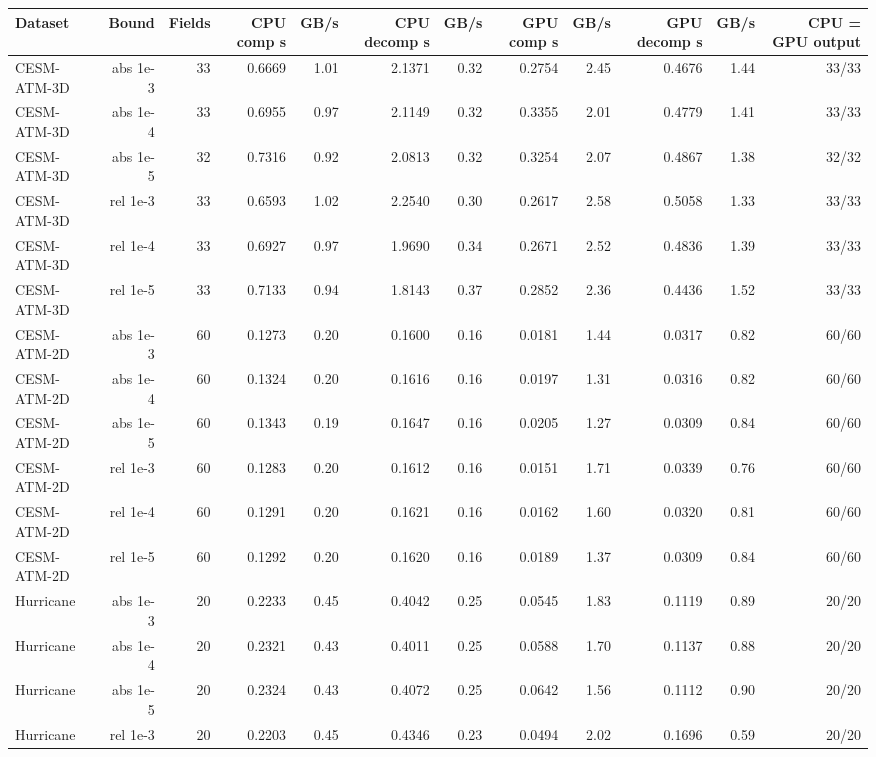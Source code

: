 \begin{tabular}{lrrrrrrrrrrr}
\toprule
\textbf{Dataset} & \textbf{Bound} & \textbf{Fields} & \textbf{CPU comp s} & \textbf{GB/s} & \textbf{CPU decomp s} & \textbf{GB/s} & \textbf{GPU comp s} & \textbf{GB/s} & \textbf{GPU decomp s} & \textbf{GB/s} & \textbf{CPU = GPU output} \\
\midrule
CESM-ATM-3D & abs 1e-3 & 33 & 0.6669 & 1.01 & 2.1371 & 0.32 & 0.2754 & 2.45 & 0.4676 & 1.44 & 33/33 \\
CESM-ATM-3D & abs 1e-4 & 33 & 0.6955 & 0.97 & 2.1149 & 0.32 & 0.3355 & 2.01 & 0.4779 & 1.41 & 33/33 \\
CESM-ATM-3D & abs 1e-5 & 32 & 0.7316 & 0.92 & 2.0813 & 0.32 & 0.3254 & 2.07 & 0.4867 & 1.38 & 32/32 \\
CESM-ATM-3D & rel 1e-3 & 33 & 0.6593 & 1.02 & 2.2540 & 0.30 & 0.2617 & 2.58 & 0.5058 & 1.33 & 33/33 \\
CESM-ATM-3D & rel 1e-4 & 33 & 0.6927 & 0.97 & 1.9690 & 0.34 & 0.2671 & 2.52 & 0.4836 & 1.39 & 33/33 \\
CESM-ATM-3D & rel 1e-5 & 33 & 0.7133 & 0.94 & 1.8143 & 0.37 & 0.2852 & 2.36 & 0.4436 & 1.52 & 33/33 \\
CESM-ATM-2D & abs 1e-3 & 60 & 0.1273 & 0.20 & 0.1600 & 0.16 & 0.0181 & 1.44 & 0.0317 & 0.82 & 60/60 \\
CESM-ATM-2D & abs 1e-4 & 60 & 0.1324 & 0.20 & 0.1616 & 0.16 & 0.0197 & 1.31 & 0.0316 & 0.82 & 60/60 \\
CESM-ATM-2D & abs 1e-5 & 60 & 0.1343 & 0.19 & 0.1647 & 0.16 & 0.0205 & 1.27 & 0.0309 & 0.84 & 60/60 \\
CESM-ATM-2D & rel 1e-3 & 60 & 0.1283 & 0.20 & 0.1612 & 0.16 & 0.0151 & 1.71 & 0.0339 & 0.76 & 60/60 \\
CESM-ATM-2D & rel 1e-4 & 60 & 0.1291 & 0.20 & 0.1621 & 0.16 & 0.0162 & 1.60 & 0.0320 & 0.81 & 60/60 \\
CESM-ATM-2D & rel 1e-5 & 60 & 0.1292 & 0.20 & 0.1620 & 0.16 & 0.0189 & 1.37 & 0.0309 & 0.84 & 60/60 \\
Hurricane & abs 1e-3 & 20 & 0.2233 & 0.45 & 0.4042 & 0.25 & 0.0545 & 1.83 & 0.1119 & 0.89 & 20/20 \\
Hurricane & abs 1e-4 & 20 & 0.2321 & 0.43 & 0.4011 & 0.25 & 0.0588 & 1.70 & 0.1137 & 0.88 & 20/20 \\
Hurricane & abs 1e-5 & 20 & 0.2324 & 0.43 & 0.4072 & 0.25 & 0.0642 & 1.56 & 0.1112 & 0.90 & 20/20 \\
Hurricane & rel 1e-3 & 20 & 0.2203 & 0.45 & 0.4346 & 0.23 & 0.0494 & 2.02 & 0.1696 & 0.59 & 20/20 \\

\end{tabular}
